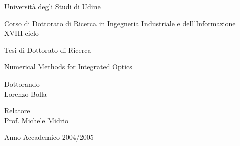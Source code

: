 
\begin{titlepage}

  \begin{center}

    \vspace*{1cm}
    Universit\`a degli Studi di Udine

    \par
    \vspace{1.5cm}
    Corso di Dottorato di Ricerca in Ingegneria Industriale e
    dell'Informazione\\
    XVIII ciclo

    \par
    \vspace{3cm}
    Tesi di Dottorato di Ricerca

    \par
    \vspace{0.5cm}
    {\Large Numerical Methods for Integrated Optics}

    \par
    \vspace{3cm}
    \begin{flushright}
      Dottorando\\
      Lorenzo Bolla
    \end{flushright}

    \par
    \vspace{1cm}
    \begin{flushleft}
      Relatore\\
      Prof. Michele Midrio
    \end{flushleft}

    \par
    \vspace{3cm}
    Anno Accademico 2004/2005
    
  \end{center}
    
\end{titlepage}


